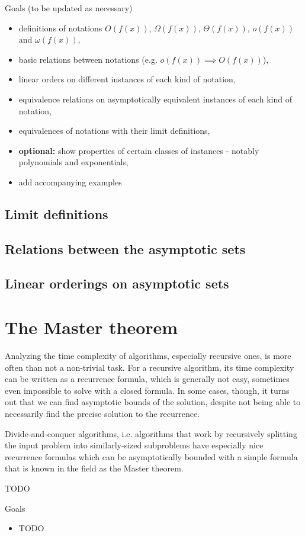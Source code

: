 Goals (to be updated as necessary)
\begin{itemize}
\item definitions of notations $O(f(x))$, $\Omega(f(x))$, $\Theta(f(x))$, $o(f(x))$ and $\omega(f(x))$,
\item basic relations between notations (e.g. $o(f(x)) \implies O(f(x))$),
\item linear orders on different instances of each kind of notation,
\item equivalence relations on asymptotically equivalent instances of each kind of notation,
\item equivalences of notations with their limit definitions,
\item \textbf{optional:} show properties of certain classes of instances - notably polynomials and exponentials,
\item add accompanying examples
\end{itemize}

\subsection{Limit definitions}

\subsection{Relations between the asymptotic sets}

\subsection{Linear orderings on asymptotic sets}

\section{The Master theorem}

Analyzing the time complexity of algorithms, especially recursive ones, is more often than not 
a non-trivial task. For a recursive algorithm, its time complexity can be written as a recurrence
formula, which is generally not easy, sometimes even impossible to solve with a closed formula.
In some cases, though, it turns out that we can find asymptotic bounds of the solution, despite not
being able to necessarily find the precise solution to the recurrence.

Divide-and-conquer algorithms, i.e. algorithms that work by recursively splitting the input problem
into similarly-sized subproblems have especially nice recurrence formulas which can be asymptotically
bounded with a simple formula that is known in the field as the Master theorem.

\begin{theorem}
TODO
\end{theorem}

Goals
\begin{itemize}
\item TODO
\end{itemize}
